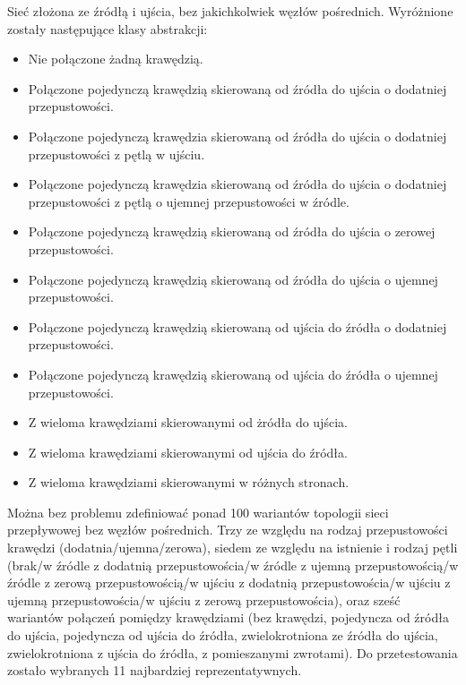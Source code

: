 \documentclass[10pt]{dokument-tiwo}
\begin{document}
Sieć złożona ze źródłą i ujścia, bez jakichkolwiek węzłów pośrednich. Wyróżnione zostały następujące klasy abstrakcji:
\begin{itemize}
    \item Nie połączone żadną krawędzią.
    \item Połączone pojedynczą krawędzią skierowaną od źródła do ujścia o dodatniej przepustowości.
    \item Połączone pojedynczą krawędzia skierowaną od źródła do ujścia o dodatniej przepustowości z pętlą w ujściu.
    \item Połączone pojedynczą krawędzia skierowaną od źródła do ujścia o dodatniej przepustowości z pętlą o ujemnej przepustowości w źródle.
    \item Połączone pojedynczą krawędzią skierowaną od źródła do ujścia o zerowej przepustowości.
    \item Połączone pojedynczą krawędzią skierowaną od źródła do ujścia o ujemnej przepustowości.
    \item Połączone pojedynczą krawędzią skierowaną od ujścia do źródła o dodatniej przepustowości.
    \item Połączone pojedynczą krawędzią skierowaną od ujścia do źródła o ujemnej przepustowości.
    \item Z wieloma krawędziami skierowanymi od żródła do ujścia.
    \item Z wieloma krawędziami skierowanymi od ujścia do źródła.
    \item Z wieloma krawędziami skierowanymi w różnych stronach.
\end{itemize}
Można bez problemu zdefiniować ponad 100 wariantów topologii sieci przepływowej bez węzłów pośrednich. Trzy ze względu na rodzaj przepustowości krawędzi (dodatnia/ujemna/zerowa), siedem ze względu na istnienie i rodzaj pętli (brak/w źródle z dodatnią przepustowościa/w źródle z ujemną przepustowością/w źródle z zerową przepustowością/w ujściu z dodatnią przepustowościa/w ujściu z ujemną przepustowościa/w ujściu z zerową przepustowościa), oraz sześć wariantów połączeń pomiędzy krawędziami (bez krawędzi, pojedyncza od źródła do ujścia, pojedyncza od ujścia do źródła, zwielokrotniona ze źródła do ujścia, zwielokrotniona z ujścia do źródła, z pomieszanymi zwrotami). Do przetestowania zostało wybranych 11 najbardziej reprezentatywnych.
\end{document}
